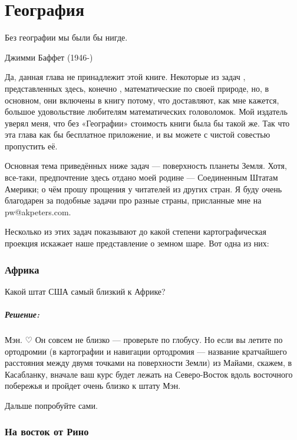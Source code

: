 \chapter*{География}

\epigraph{Без географии  мы были бы нигде.}{Джимми Баффет (1946-)}


Да, данная глава не принадлежит этой книге. %
Некоторые из задач , представленных здесь, конечно , математические по своей природе, %
но,  в основном, они включены в книгу потому, что доставляют, как  мне кажется, большое удовольствие любителям математических головоломок.  Мой издатель уверял меня, что без «Географии» стоимость книги была бы такой же. 
Так что эта глава  как бы бесплатное приложение, и вы можете с чистой совестью  пропустить её.


Основная тема приведённых ниже задач ---  поверхность планеты Земля. Хотя, все-таки, предпочтение здесь отдано моей родине --- Соединенным Штатам Америки;  о чём прошу прощения у читателей из других стран. Я буду очень благодарен за подобные задачи про разные страны, присланные мне на pw@akpeters.com.     


Несколько из этих задач показывают до какой степени %
картографическая проекция %
искажает наше представление о земном шаре. %
Вот одна из них:


\subsection*{Африка}


Какой штат США самый близкий к Африке?


\paragraph{Решение:}  Мэн.
                                ♡                                   
Он совсем не близко --- проверьте по глобусу.  Но если вы летите по ортодромии  (в картографии и навигации ортодромия --- название кратчайшего расстояния между двумя точками на поверхности Земли)  из Майами, скажем, в Касабланку,  вначале ваш курс %
будет лежать  на Северо-Восток вдоль восточного побережья и пройдет очень близко к штату Мэн.


Дальше попробуйте  сами.


\subsection*{На восток от Рино}%


